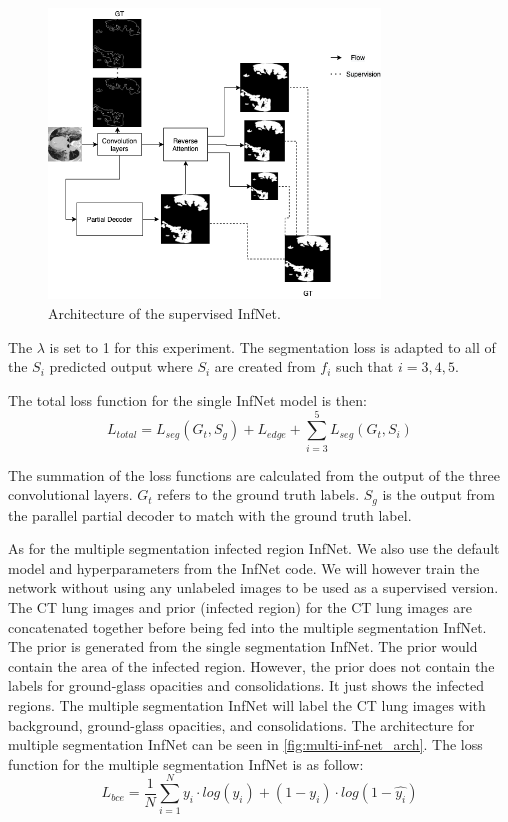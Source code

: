 \begin{figure}
	\small
	\includegraphics[width=88mm]{supervised-inf-net.png}
	\caption{Architecture of the supervised InfNet.  }
	\label{fig:supervised-inf-net_arch}
\end{figure}

The $\lambda$ is set to 1 for this experiment. The segmentation loss is adapted to all of the ${S_i}$ predicted output where ${S_i}$ are created from $f_i$ such that $i={3,4,5}$. 

The total loss function for the single InfNet model is then:
\begin{equation}
L_{total} = L_{seg}(G_t, S_g) + L_{edge} + 	\sum_{i=3}^{5}L_{seg}(G_t, S_i)
\end{equation}

The summation of the loss functions are calculated from the output of the three convolutional layers. $G_t$ refers to the ground truth labels. $S_g$ is the output from the parallel partial decoder to match with the ground truth label.

As for the multiple segmentation infected region InfNet. We also use the default model and hyperparameters from the InfNet code. We will however train the network without using any unlabeled images to be used as a supervised version. The CT lung images and prior (infected region) for the CT lung images are concatenated together before being fed into the multiple segmentation InfNet. The prior is generated from the single segmentation InfNet. The prior would contain the area of the infected region. However, the prior does not contain the labels for ground-glass opacities and consolidations. It just shows the infected regions. The multiple segmentation InfNet will label the CT lung images with background, ground-glass opacities, and consolidations. The architecture for multiple segmentation InfNet can be seen in \ref{fig:multi-inf-net_arch}. The loss function for the multiple segmentation InfNet is as follow:
\begin{equation}
L_{bce} = \frac{1}{N}\sum_{i=1}^{N} y_i \cdot log(\hat{y_i}) + (1-y_i)\cdot log(1-\hat{y_i})
\end{equation}

